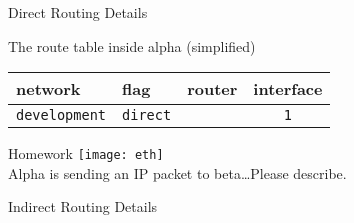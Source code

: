 \begin{frame}{Direct Routing Details}
  \begin{center}
  \end{center}

  \begin{iblock}{The route table inside alpha (simplified)}
    \begin{center}
      \begin{tabular}{llcc}
        \toprule
        network & flag & router & interface\\\midrule
        \texttt{development} & \texttt{direct} & & \texttt{1}\\\bottomrule
      \end{tabular}
    \end{center}
  \end{iblock}
\end{frame}

\begin{frame}{Homework}
  \centering
  \texttt{[image: eth]}\\[2em]
  Alpha is sending an IP packet to beta\ldots{}Please describe.
\end{frame}
  
\begin{frame}{Indirect Routing Details}\label{indirect-routing-2}
  \centering
  \mode<beamer>{ \texttt{[image: indirect-routing-2]} }%
\end{frame}

